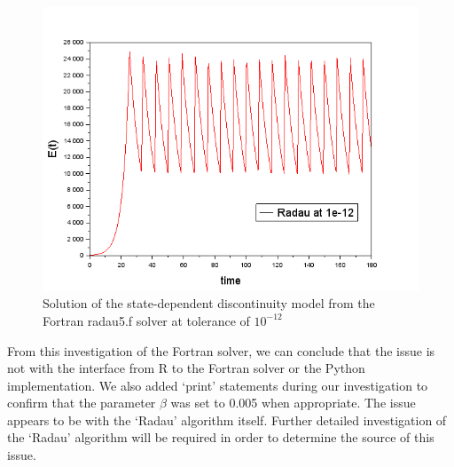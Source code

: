 \begin{figure}[h]
\centering
\includegraphics[width=0.7\linewidth]{./figures/fortran_radau_tol_12}
\caption{Solution of the state-dependent discontinuity model from the Fortran radau5.f solver at tolerance of $10^{-12}$}
\label{fig:fortran_radau_tol_12}
\end{figure}

From this investigation of the Fortran solver, we can conclude that the issue is not with the interface from R to the Fortran solver or the Python implementation. We also added `print' statements during our investigation to confirm that the parameter $\beta$ was set to 0.005 when appropriate. The issue appears to be with the `Radau' algorithm itself. Further detailed investigation of the `Radau' algorithm will be required in order to determine the source of this issue.
